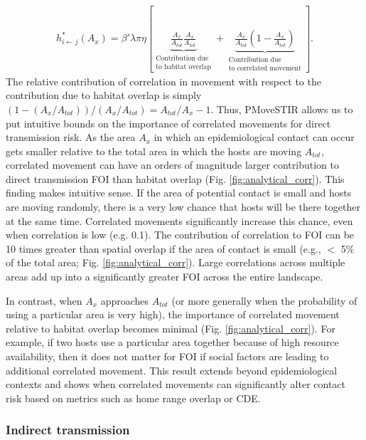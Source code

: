 \documentclass[letterpaper]{article}
\begin{document}
\begin{equation}
    \begin{aligned}
        h^*_{i \leftarrow j}(A_x) = \beta' \lambda \pi \eta \left[\underbrace{\frac{A_x}{A_{tot}}\frac{A_x}{A_{tot}}}_{\substack{\text{Contribution due} \\  \text{to habitat overlap}}} + \underbrace{\frac{A_x}{A_{tot}}(1 - \frac{A_x}{A_{tot}})}_{\substack{\text{Contribution due} \\ \text{to correlated movement}}} \right].
    \end{aligned}
    \label{eq:uniform_direct}
\end{equation}
The relative contribution of correlation in movement with respect to the contribution due to habitat overlap is simply $(1 - (A_x / A_{tot})) / (A_x / A_{tot})=A_{tot}/A_x-1$. 
Thus, PMoveSTIR allows us to put intuitive bounds on the importance of correlated movements for direct transmission risk. 
As the area $A_x$ in which an epidemiological contact can occur gets smaller relative to the total area in which the hosts are moving $A_{tot}$, correlated movement can have an orders of magnitude larger contribution to direct transmission FOI than habitat overlap (Fig. \ref{fig:analytical_corr}). 
This finding makes intuitive sense. If the area of potential contact is small and hosts are moving randomly, there is a very low chance that hosts will be there together at the same time. Correlated movements significantly increase this chance, even when correlation is low (e.g. 0.1). The contribution of correlation to FOI can be 10 times greater than spatial overlap if the area of contact is small (e.g., $<$ 5\% of the total area; Fig. \ref{fig:analytical_corr}). Large correlations across multiple areas add up into a significantly greater FOI across the entire landscape. 

In contrast, when $A_x$ approaches $A_{tot}$ (or more generally when the probability of using a particular area is very high), the importance of correlated movement relative to habitat overlap becomes minimal (Fig. \ref{fig:analytical_corr}). For example, if two hosts use a particular area together because of high resource availability, then it does not matter for FOI if social factors are leading to additional correlated movement. This result extends beyond epidemiological contexts and shows when correlated movements can significantly alter contact risk based on metrics such as home range overlap or CDE.

\subsubsection*{Indirect transmission}
\end{document}
